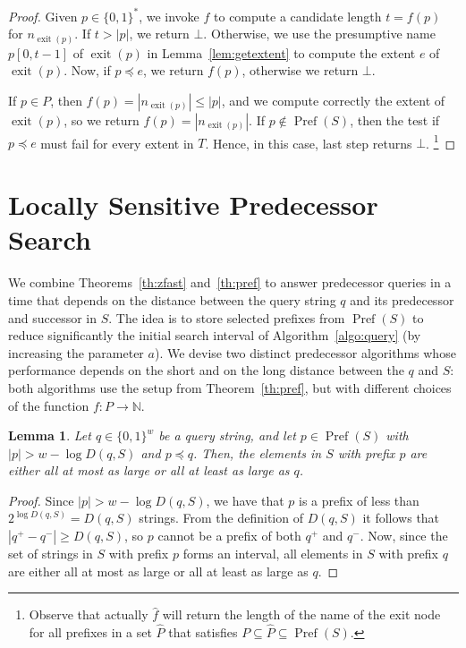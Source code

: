 \documentclass[a4paper,11pt]{article}
\newtheorem{lemma}[theorem]{Lemma}
\newcommand{\N}{\mathbb{N}}
\newcommand{\?}{\mskip1.5mu}
\DeclareMathOperator{\exit}{exit}
\DeclareMathOperator{\Pref}{Pref}
\begin{document}
\begin{proof}
Given $p \in \{0, 1\}^*$, we invoke
$f$ to compute a candidate length $t = f(p)$ 
for $n_{\exit(p)}$.
If $t > |p|$, we return $\bot$.
Otherwise,  we use the presumptive
name $p[0, t - 1]$ of $\exit(p)$ 
in Lemma~\ref{lem:getextent} to compute 
the extent $e$ of $\exit(p)$. Now, 
if $p  \preceq e$, we return $f(p)$, otherwise we return $\bot$.

If $p\in P$, then $f(p) = |n_{\exit(p)}| \leq |p|$, and we
compute correctly the extent of $\exit(p)$, so we return 
$f(p)=|n_{\exit(p)}|$.
If $p \not\in \Pref(S)$, then the test if 
$p \preceq e$ must fail for every extent in $T$. 
Hence, in this case, last step returns $\bot$.
\footnote{Observe that actually $\hat f$ will return the length 
of the name of the exit node for all prefixes in a set $\hat P$ that 
satisfies $P\subseteq \hat P\subseteq\Pref(S)$.}
\end{proof}

\section{Locally Sensitive Predecessor Search}
\label{sec:pred}

We combine Theorems~\ref{th:zfast} and~\ref{th:pref} 
to answer predecessor queries in a time that depends 
on the distance between the query string $q$ and its 
predecessor and successor in $S$. The idea 
is to store selected prefixes from $\Pref(S)$
to reduce significantly the initial search interval of
Algorithm~\ref{algo:query} (by increasing the parameter $a$).
We devise two distinct predecessor algorithms whose 
performance depends on the short and on the
long distance between the $q$ and $S$:
both algorithms use the setup from Theorem~\ref{th:pref}, but with 
different choices of the function $f:P\to \N$. 

\begin{lemma}
\label{lemma:shortinprefs}
Let $q \in \{0, 1\}^w$ be a query string,
and let $p \in \Pref(S)$ with 
$|p| > w - \log D(q,S)$ and
$p \preceq q$. Then, 
the elements in $S$ with prefix $p$
are either all at most as large or all
at least as large as $q$.
\end{lemma}

\begin{proof}
Since $|p| > w - \log D(q, S)$, we have
that $p$ is a prefix of less than
$2^{\log D(q,S)} = D(q, S)$ strings.
From the definition of $D(q, S)$ it follows
that $|q^+ - q^-| \geq D(q, S)$, so $p$
cannot be a prefix of both $q^+$ and $q^-$.
Now, since the set of strings in $S$ 
with prefix $p$ forms an interval, all elements
in $S$ with prefix $q$ are either all at most as large
or all at least as large as $q$.
\end{proof}
\end{document}
